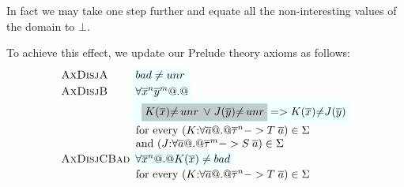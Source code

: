 
 In fact we may take
one step further and equate all the non-interesting values of the domain to $\bot$.

To achieve this effect, we update our Prelude theory axioms as follows:
{\small
\[\setlength{\arraycolsep}{1pt}
\begin{array}{c}
\begin{array}{lll}
 \textsc{AxDisjA} & \formula{\bad \neq \unr}  \\
 \textsc{AxDisjB} & \formula{\forall \oln{x}{n}\oln{y}{m} @.@} \\
                  & \formula{\;\;\highlight{K(\ol{x}){\neq}\unr\;\lor\;J(\ol{y}){\neq}\unr} =>
                                  K(\ol{x}){\neq}J(\ol{y})} \\
                  & \text{ for every } (K{:}\forall\as @.@ \oln{\tau}{n} -> T\;\as) \in \Sigma \\
                  & \text{ and } (J{:}\forall\as @.@ \oln{\tau}{m} -> S\;\as) \in \Sigma \\
 \textsc{AxDisjCBad} & \formula{\forall \oln{x}{n} @.@ K(\ol{x}) \neq \bad} \\
                  & \text{ for every } (K{:}\forall\as @.@ \oln{\tau}{n} -> T\;\as) \in \Sigma \\ \\


\end{array}
\end{array}\]}
